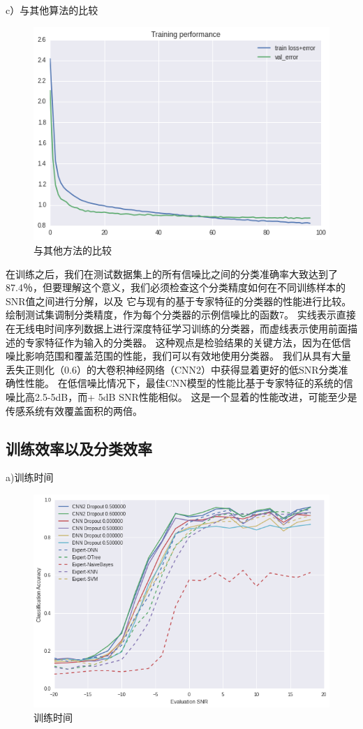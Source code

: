 c）与其他算法的比较
\begin{figure}[!h]
	\centering
	\includegraphics[scale=0.3]{figures/chapter_3/loss}
	\caption{与其他方法的比较}	\label{fig_3_2}
\end{figure}

在训练之后，我们在测试数据集上的所有信噪比之间的分类准确率大致达到了87.4％，但要理解这个意义，我们必须检查这个分类精度如何在不同训练样本的SNR值之间进行分解，以及 它与现有的基于专家特征的分类器的性能进行比较。绘制测试集调制分类精度，作为每个分类器的示例信噪比的函数7。 实线表示直接在无线电时间序列数据上进行深度特征学习训练的分类器，而虚线表示使用前面描述的专家特征作为输入的分类器。 这种观点是检验结果的关键方法，因为在低信噪比影响范围和覆盖范围的性能，我们可以有效地使用分类器。 我们从具有大量丢失正则化（0.6）的大卷积神经网络（CNN2）中获得显着更好的低SNR分类准确性性能。 在低信噪比情况下，最佳CNN模型的性能比基于专家特征的系统的信噪比高2.5-5dB，而+ 5dB SNR性能相似。 这是一个显着的性能改进，可能至少是传感系统有效覆盖面积的两倍。\par


\subsection{训练效率以及分类效率}

a)训练时间
\begin{figure}[!h]
	\centering
	\includegraphics[scale=0.3]{figures/chapter_3/result}
	\caption{训练时间}	\label{fig_3_2}
\end{figure}

